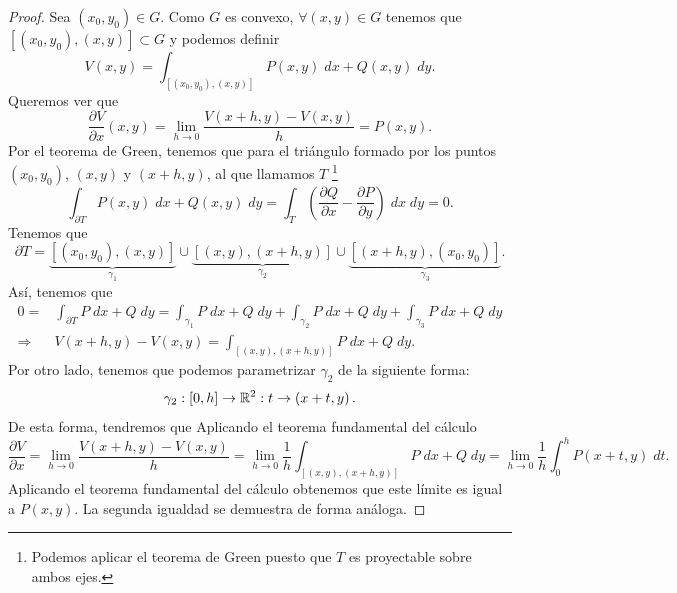 \begin{proof}
	Sea $\displaystyle \left(x_{0}, y_{0}\right)\in G $. Como $\displaystyle G $ es convexo, $\displaystyle \forall\left(x,y\right)\in G $ tenemos que $\displaystyle \left[\left(x_{0}, y_{0}\right), \left(x,y\right)\right] \subset G $ y podemos definir
	\[V\left(x,y\right)=\int _{\left[\left(x_{0}, y_{0}\right), \left(x,y\right)\right] }P\left(x,y\right) \; dx + Q\left(x,y\right)\; dy .\]
Queremos ver que 
\[\frac{\partial V}{\partial x}\left(x,y\right)=\lim_{h \to 0}\frac{V\left(x+h, y\right)-V\left(x,y\right)}{h}=P\left(x,y\right) .\]
Por el teorema de Green, tenemos que para el triángulo formado por los puntos $\displaystyle \left(x_{0}, y_{0}\right) $, $\displaystyle \left(x,y\right) $ y $\displaystyle \left(x + h, y\right) $, al que llamamos $\displaystyle T $ \footnote{Podemos aplicar el teorema de Green puesto que $\displaystyle T $ es proyectable sobre ambos ejes.} 
\[\int _{\partial T}P\left(x,y\right) \; dx + Q\left(x,y\right)\; dy = \int _{T}\left(\frac{\partial Q}{\partial x}-\frac{\partial P}{\partial y}\right) \; dx \; dy= 0 .\]
Tenemos que 
\[\partial T = \underbrace{\left[\left(x_{0}, y_{0}\right), \left(x,y\right)\right]}_{\gamma_{1}} \cup \underbrace{\left[\left(x,y\right), \left(x + h, y\right)\right]}_{\gamma_{2}} \cup \underbrace{\left[\left(x+h,y\right), \left(x_{0}, y_{0}\right)\right]}_{\gamma_{3}}  .\]
Así, tenemos que 
\[
\begin{split}
	0 = & \int _{\partial T}P \; dx + Q \; dy = \int _{\gamma _{1}}P \; dx + Q \; dy + \int _{\gamma_{2}} P\; dx + Q \; dy + \int _{\gamma _{3}}P \; dx + Q \; dy \\
	\Rightarrow & V\left(x + h,y\right) - V\left(x,y\right) = \int _{\left[\left(x,y\right), \left(x+h,y\right)\right] }P \; dx + Q \; dy  .
\end{split}
\]
Por otro lado, tenemos que podemos parametrizar $\displaystyle \gamma_{2} $ de la siguiente forma:
\[\gamma_{2} : \left[0,h\right] \to \mathbb{R}^{2} : t \to \left(x + t, y\right) .\]
De esta forma, tendremos que 
Aplicando el teorema fundamental del cálculo
\[\frac{\partial V}{\partial x} = \lim_{h \to 0}\frac{V\left(x+h,y\right)-V\left(x,y\right)}{h}=\lim_{h \to 0}\frac{1}{h} \int _{\left[\left(x,y\right), \left(x+h,y\right)\right] }P \; dx + Q \; dy = \lim_{h \to 0}\frac{1}{h}\int^{h}_{0} P\left(x + t, y\right) \; dt.\]
Aplicando el teorema fundamental del cálculo obtenemos que este límite es igual a $\displaystyle P\left(x,y\right) $. La segunda igualdad se demuestra de forma análoga.
\end{proof}

